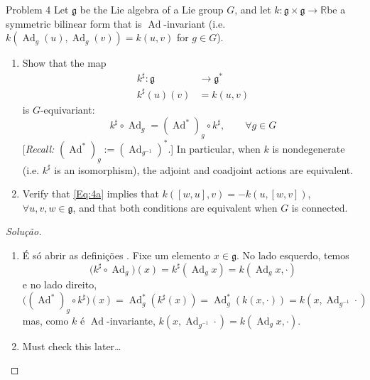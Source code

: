 \begin{thing4}{Problem 4}\leavevmode
	Let $\mathfrak{g}$ be the Lie algebra of a Lie group $G$, and let  $k:\mathfrak{g} \times \mathfrak{g}\to \mathbb{R}$be a symmetric bilinear form that is $\operatorname{Ad}$-invariant (i.e. $k(\operatorname{Ad}_g(u),\operatorname{Ad}_g(v))=k(u,v)$ for $g\in G$).
	\begin{enumerate}[label=\alph*.]
		\item Show that the map
			\begin{equation}\label{Eq:4a}\begin{aligned}
				k^\sharp:\mathfrak{g}  &\longrightarrow \mathfrak{g}^* \\
				k^\sharp(u)(v) &=k(u,v)\end{aligned}
			\end{equation}
			is $G$-equivariant:
			\[k^\sharp \circ \operatorname{Ad}_g=(\operatorname{Ad}^*)_g\circ k^\sharp,\qquad \forall g\in G\]
			[\textit{Recall:} $(\operatorname{Ad}^* )_g:=(\operatorname{Ad}_{g^{-1}})^*$.] In particular, when $k$ is nondegenerate (i.e. $k^\sharp$ is an isomorphism), the adjoint and coadjoint actions are equivalent.

		\item Verify that \cref{Eq:4a} implies that $k([w,u],v)=-k(u,[w,v])$,  $\forall u,v,w\in\mathfrak{g}$, and that both conditions are equivalent when $G$ is connected.
	\end{enumerate}
\end{thing4}

\begin{proof}[Solução]
	\begin{enumerate}[label=\alph*.]
		\item É só abrir as definições . Fixe um elemento $x\in\mathfrak{g}$. No lado esquerdo, temos
			\[\Big(k^\sharp \circ \operatorname{Ad}_g\Big)(x)=k^\sharp(\operatorname{Ad}_gx)=k(\operatorname{Ad}_gx,\cdot )\]
			e no lado direito,
			\[\Big((\operatorname{Ad}^* )_g\circ k^\sharp \Big) (x)=\operatorname{Ad}^*_g(k^\sharp (x))=\operatorname{Ad}^* _g(k(x,\cdot ))=k(x,\operatorname{Ad}_{g^{-1}}\cdot )\]
			mas, como $k$ é $\operatorname{Ad}$-invariante,
			$k(x,\operatorname{Ad}_{g^{-1}}\cdot )=k(\operatorname{Ad}_gx,\cdot )$.

		\item Must check this later…
	\end{enumerate}
\end{proof}

